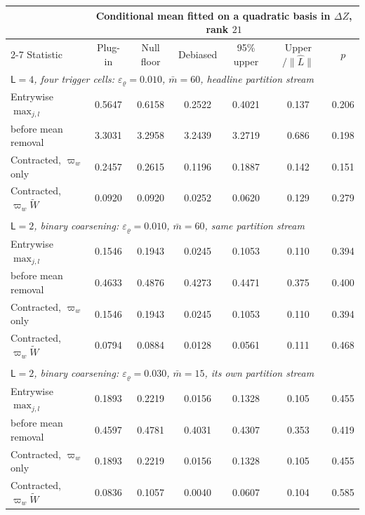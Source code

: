 \begin{tabular}{lcccccc}
\toprule
& \multicolumn{6}{c}{Conditional mean fitted on a quadratic basis in $\Delta Z$, rank $21$} \\
\cmidrule(lr){2-7}
Statistic & Plug-in & Null floor & Debiased & 95\% upper & Upper$/\|\widehat{L}\|$ & $p$ \\
\midrule
\multicolumn{7}{l}{\textit{$\mathsf{L}=4$, four trigger cells: $\varepsilon_\varrho=0.010$, $\bar m=60$, headline partition stream}} \\
\quad Entrywise $\max_{j,l}$ & 0.5647 & 0.6158 & 0.2522 & 0.4021 & 0.137 & 0.206 \\
\quad \quad before mean removal & 3.3031 & 3.2958 & 3.2439 & 3.2719 & 0.686 & 0.198 \\
\quad Contracted, $\varpi_w$ only & 0.2457 & 0.2615 & 0.1196 & 0.1887 & 0.142 & 0.151 \\
\quad Contracted, $\varpi_w \widetilde{W}$ & 0.0920 & 0.0920 & 0.0252 & 0.0620 & 0.129 & 0.279 \\
\\[0.4em]
\multicolumn{7}{l}{\textit{$\mathsf{L}=2$, binary coarsening: $\varepsilon_\varrho=0.010$, $\bar m=60$, same partition stream}} \\
\quad Entrywise $\max_{j,l}$ & 0.1546 & 0.1943 & 0.0245 & 0.1053 & 0.110 & 0.394 \\
\quad \quad before mean removal & 0.4633 & 0.4876 & 0.4273 & 0.4471 & 0.375 & 0.400 \\
\quad Contracted, $\varpi_w$ only & 0.1546 & 0.1943 & 0.0245 & 0.1053 & 0.110 & 0.394 \\
\quad Contracted, $\varpi_w \widetilde{W}$ & 0.0794 & 0.0884 & 0.0128 & 0.0561 & 0.111 & 0.468 \\
\\[0.4em]
\multicolumn{7}{l}{\textit{$\mathsf{L}=2$, binary coarsening: $\varepsilon_\varrho=0.030$, $\bar m=15$, its own partition stream}} \\
\quad Entrywise $\max_{j,l}$ & 0.1893 & 0.2219 & 0.0156 & 0.1328 & 0.105 & 0.455 \\
\quad \quad before mean removal & 0.4597 & 0.4781 & 0.4031 & 0.4307 & 0.353 & 0.419 \\
\quad Contracted, $\varpi_w$ only & 0.1893 & 0.2219 & 0.0156 & 0.1328 & 0.105 & 0.455 \\
\quad Contracted, $\varpi_w \widetilde{W}$ & 0.0836 & 0.1057 & 0.0040 & 0.0607 & 0.104 & 0.585 \\
\bottomrule
\end{tabular}

